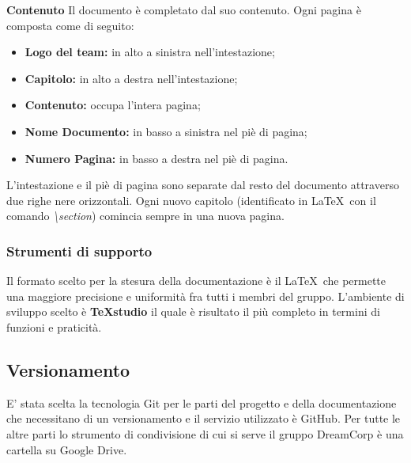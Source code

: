 		\newline \newline \textbf{Contenuto}  Il documento è completato dal suo contenuto. Ogni pagina è composta come di seguito:\newline
		\begin{itemize}
			\item \textbf{Logo del team:} in alto a sinistra nell'intestazione;
			\item \textbf{Capitolo:} in alto a destra nell'intestazione;
			\item \textbf{Contenuto:} occupa l'intera pagina;
			\item \textbf{Nome Documento:} in basso a sinistra nel piè di pagina;
			\item \textbf{Numero Pagina:} in basso a destra nel piè di pagina. \newline
		\end{itemize}
		L'intestazione e il piè di pagina sono separate dal resto del documento attraverso due righe nere orizzontali. Ogni nuovo capitolo (identificato in \LaTeX ~con il comando \textit{\textbackslash{}section}) comincia sempre in una nuova pagina.
		\subsubsection{Strumenti di supporto}
			Il formato scelto per la stesura della documentazione è il  \LaTeX ~che permette una maggiore precisione e uniformità fra tutti i membri del gruppo. L'ambiente di sviluppo scelto è \textbf{TeXstudio\pedice} il quale è risultato il più completo in termini di funzioni e praticità.
	\subsection{Versionamento}
		E' stata scelta la tecnologia Git per le parti del progetto e della documentazione che necessitano di un versionamento e il servizio utilizzato è GitHub. Per tutte le altre parti lo strumento di condivisione di cui si serve il gruppo DreamCorp è una cartella su Google Drive\pedice.
